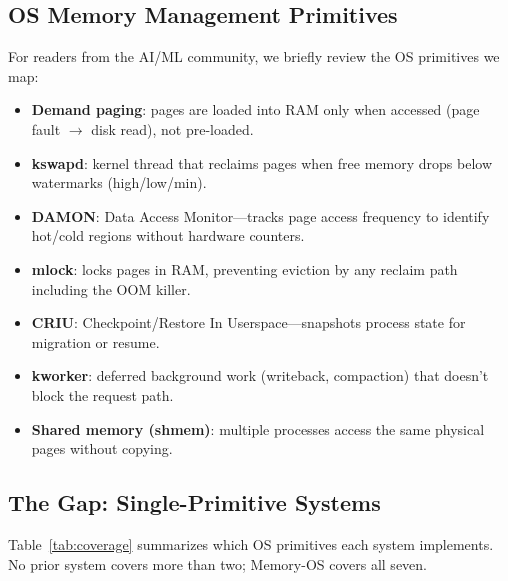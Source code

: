 \documentclass[10pt,twocolumn]{article}
\begin{document}
\subsection{OS Memory Management Primitives}

For readers from the AI/ML community, we briefly review the OS primitives we map:

\begin{itemize}[leftmargin=*,nosep]
  \item \textbf{Demand paging}: pages are loaded into RAM only when accessed (page fault $\to$ disk read), not pre-loaded.
  \item \textbf{kswapd}: kernel thread that reclaims pages when free memory drops below watermarks (high/low/min).
  \item \textbf{DAMON}: Data Access Monitor---tracks page access frequency to identify hot/cold regions without hardware counters.
  \item \textbf{mlock}: locks pages in RAM, preventing eviction by any reclaim path including the OOM killer.
  \item \textbf{CRIU}: Checkpoint/Restore In Userspace---snapshots process state for migration or resume.
  \item \textbf{kworker}: deferred background work (writeback, compaction) that doesn't block the request path.
  \item \textbf{Shared memory (shmem)}: multiple processes access the same physical pages without copying.
\end{itemize}

\subsection{The Gap: Single-Primitive Systems}

Table~\ref{tab:coverage} summarizes which OS primitives each system implements. No prior system covers more than two; Memory-OS covers all seven.
\end{document}
